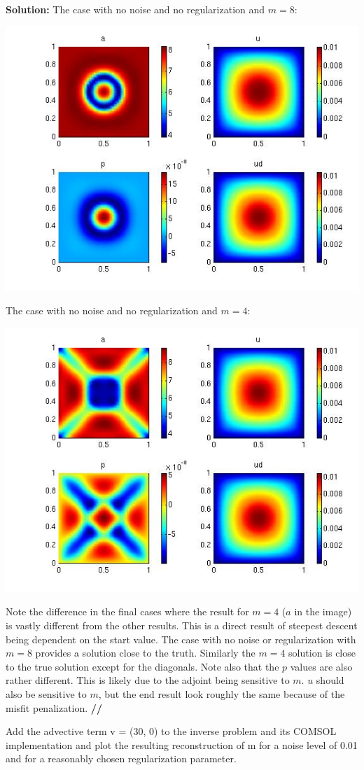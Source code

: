 \documentclass[11pt]{article}
\newenvironment{solution}{\begin{trivlist}\item[]{\bf Solution:}}
                      {\textbf{//} \end{trivlist}}
\begin{document}
\begin{enumerate}
\begin{solution}
The case with no noise and no regularization and $m = 8$:
\begin{center}
\includegraphics[width = 6 cm]{figs/prob2aNoNoiseNoRegM8.jpg}
\end{center}

The case with no noise and no regularization and $m = 4$:
\begin{center}
\includegraphics[width = 6 cm]{figs/prob2aNoNoiseNoRegM4.jpg}
\end{center}

Note the difference in the final cases where the result for $m = 4$ ($a$
 in the image) is vastly different from the other results. This is a
 direct result of steepest descent being dependent on the start
 value. The case with no noise or regularization with $m = 8$ provides a 
 solution close to the truth. Similarly
 the $m = 4$ solution is close to the true solution except for the
 diagonals. Note also that the $p$ values are also rather
 different. This is likely due to the adjoint being sensitive to
 $m$. $u$ should also be sensitive to $m$, but the end result look
 roughly the same because of the misfit penalization.
\end{solution}

\item[(b)] Add the advective term v = (30, 0) to the inverse problem and its COMSOL
	  implementation and plot the resulting reconstruction of m for
	  a noise level of 0.01 and for a reasonably chosen regularization parameter.


\end{enumerate}
\end{document}
